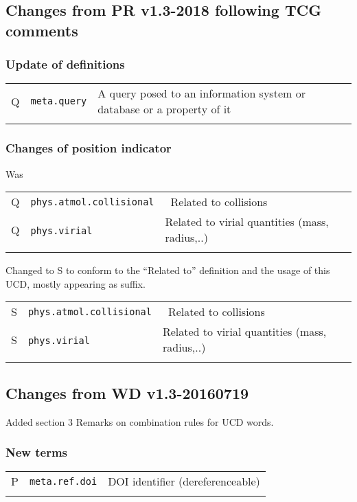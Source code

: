 \documentclass[11pt,a4paper]{ivoa}
\begin{document}
\subsection{Changes from PR v1.3-2018 following TCG comments}
\subsubsection*{Update of definitions} 
\footnotesize\begin{longtable}[h!]{c|p{40ex}|p{}}
\sptablerule
Q & {\tt meta.query} &  A query posed to an information system or database or a property of it\\
\sptablerule
\end{longtable}

\subsubsection*{Changes of position indicator} 
Was
\footnotesize\begin{longtable}[h!]{c|p{40ex}|p{}}
\sptablerule
Q & {\tt phys.atmol.collisional} & Related to collisions\\
Q & {\tt phys.virial}            & Related to virial quantities (mass, radius,..)\\
\sptablerule
\end{longtable}
Changed to S to conform to the “Related to” definition and the usage of this UCD, mostly appearing as suffix.  
\footnotesize\begin{longtable}[h!]{c|p{40ex}|p{}}
\sptablerule
S & {\tt phys.atmol.collisional} & Related to collisions\\
S & {\tt phys.virial}            & Related to virial quantities (mass, radius,..)\\
\sptablerule
\end{longtable}

\subsection{Changes from WD v1.3-20160719}
Added section 3 Remarks on combination rules for UCD words.

\subsubsection*{New terms}
\footnotesize\begin{longtable}[h!]{c|p{40ex}|p{}}
\sptablerule
P & {\tt meta.ref.doi} & DOI identifier (dereferenceable)\\
\sptablerule
\end{longtable}
\end{document}

